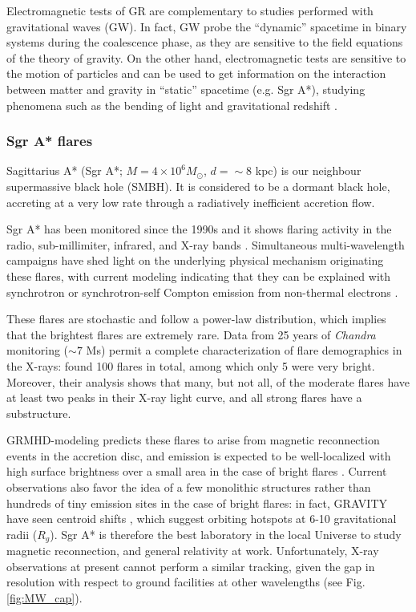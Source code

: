 \documentclass[fleqn,10pt]{SelfArx}
\begin{document}
Electromagnetic tests of GR are complementary to studies performed with gravitational waves (GW). In fact, GW probe the ``dynamic'' spacetime in binary systems during the coalescence phase, as they are sensitive to the field equations of the theory of gravity. On the other hand, electromagnetic tests are sensitive to the motion of particles and can be used to get information on the interaction between matter and gravity in ``static'' spacetime (e.g. Sgr A*), studying phenomena such as the bending of light and gravitational redshift \citep{Bambi2017, 2022hxga.book...81A}.

\subsubsection{Sgr A* flares}\label{subsubsec:flares}

Sagittarius A* (Sgr A*; $M = 4 \times 10^6  M_{\odot}$, $d = \sim 8$ kpc) is our neighbour supermassive black hole (SMBH). It is considered to be a dormant black hole, accreting at a very low rate through a radiatively inefficient accretion flow.

Sgr A* has been monitored since the 1990s and it shows flaring activity in the radio, sub-millimiter, infrared, and X-ray bands \citep[e.g.][]{Dodds-Eden2011,Witzel2021,2025Fellenberg}. Simultaneous multi-wavelength campaigns have shed light on the underlying physical mechanism originating these flares, with current modeling indicating that they can be explained with synchrotron or synchrotron-self Compton emission from non-thermal electrons \citep{Dodds-Eden2009,Ponti2017,GRAVITY2021}. 

These flares are stochastic and follow a power-law distribution, which implies that the brightest flares are extremely rare. Data from 25 years of \textit{Chandra} monitoring ($\sim 7$ Ms) permit a complete characterization of flare demographics in the X-rays: \cite{Sumners2026} found 100 flares in total, among which only 5 were very bright. Moreover, their analysis shows that many, but not all, of the moderate flares have at least two peaks in their X-ray light curve, and all strong flares have a substructure. 

GRMHD-modeling predicts these flares to arise from magnetic reconnection events in the accretion disc, and emission is expected to be well-localized with high surface brightness over a small area in the case of bright flares \citep{Ripperda2020,Chatterjee2021}. Current observations also favor the idea of a few monolithic structures rather than hundreds of tiny emission sites in the case of bright flares: in fact, GRAVITY have seen centroid shifts \citep{GRAVITY2018, GRAVITY2020B}, which suggest orbiting hotspots at 6-10 gravitational radii ($R_g$). Sgr A* is therefore the best laboratory in the local Universe to study magnetic reconnection, and general relativity at work. Unfortunately, X-ray observations at present cannot perform a similar tracking, given the gap in resolution with respect to ground facilities at other wavelengths (see Fig. \ref{fig:MW_cap}).
\end{document}
